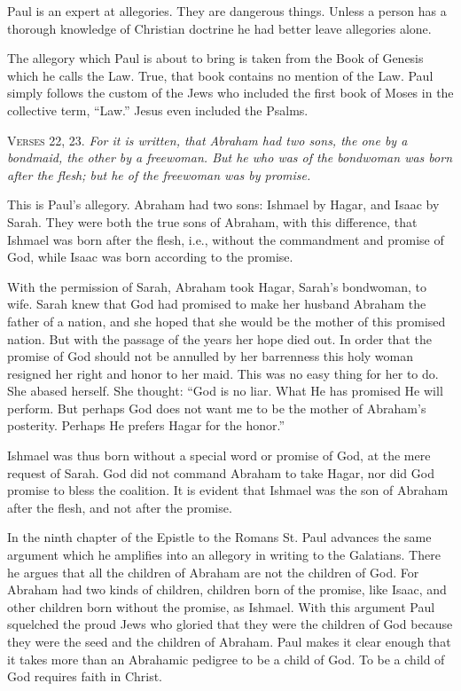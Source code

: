 Paul is an expert at allegories. They are dangerous things. Unless a person has a thorough knowledge of Christian doctrine he had better leave allegories alone.

The allegory which Paul is about to bring is taken from the Book of Genesis which he calls the Law. True, that book contains no mention of the Law. Paul simply follows the custom of the Jews who included the first book of Moses in the collective term, “Law.” Jesus even included the Psalms.

\textsc{Verses} 22, 23. \emph{For it is written, that Abraham had two sons, the one by a bondmaid, the other by a freewoman. But he who was of the bondwoman was born after the flesh; but he of the freewoman was by promise.}

This is Paul’s allegory. Abraham had two sons: Ishmael by Hagar, and Isaac by Sarah. They were both the true sons of Abraham, with this difference, that Ishmael was born after the flesh, i.e., without the commandment and promise of God, while Isaac was born according to the promise.

With the permission of Sarah, Abraham took Hagar, Sarah’s bondwoman, to wife. Sarah knew that God had promised to make her husband Abraham the father of a nation, and she hoped that she would be the mother of this promised nation. But with the passage of the years her hope died out. In order that the promise of God should not be annulled by her barrenness this holy woman resigned her right and honor to her maid. This was no easy thing for her to do. She abased herself. She thought: “God is no liar. What He has promised He will perform. But perhaps God does not want me to be the mother of Abraham’s posterity. Perhaps He prefers Hagar for the honor.”

Ishmael was thus born without a special word or promise of God, at the mere request of Sarah. God did not command Abraham to take Hagar, nor did God promise to bless the coalition. It is evident that Ishmael was the son of Abraham after the flesh, and not after the promise.

In the ninth chapter of the Epistle to the Romans St. Paul advances the same argument which he amplifies into an allegory in writing to the Galatians. There he argues that all the children of Abraham are not the children of God. For Abraham had two kinds of children, children born of the promise, like Isaac, and other children born without the promise, as Ishmael. With this argument Paul squelched the proud Jews who gloried that they were the children of God because they were the seed and the children of Abraham. Paul makes it clear enough that it takes more than an Abrahamic pedigree to be a child of God. To be a child of God requires faith in Christ.

